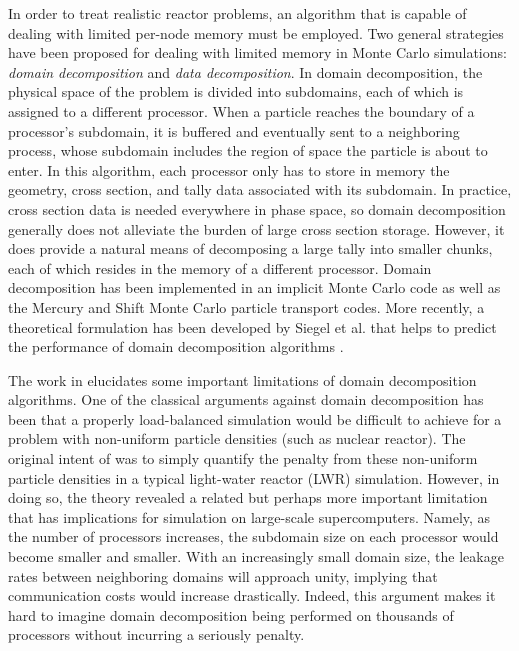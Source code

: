 \documentclass[3p]{elsarticle}
\begin{document}
In order to treat realistic reactor problems, an algorithm that is capable of
dealing with limited per-node memory must be employed. Two general strategies
have been proposed for dealing with limited memory in Monte Carlo simulations:
\emph{domain decomposition} and \emph{data decomposition}. In domain
decomposition, the physical space of the problem is divided into subdomains,
each of which is assigned to a different processor. When a particle reaches the
boundary of a processor's subdomain, it is buffered and eventually sent to a
neighboring process, whose subdomain includes the region of space the particle
is about to enter. In this algorithm, each processor only has to store in memory
the geometry, cross section, and tally data associated with its subdomain. In
practice, cross section data is needed everywhere in phase space, so domain
decomposition generally does not alleviate the burden of large cross section
storage. However, it does provide a natural means of decomposing a large tally
into smaller chunks, each of which resides in the memory of a different
processor. Domain decomposition has been implemented in an implicit Monte Carlo
code \cite{jcp-brunner-2009} as well as the Mercury \cite{mc09-greenman} and
Shift \cite{physor2012-mervin} Monte Carlo particle transport codes. More
recently, a theoretical formulation has been developed by Siegel et al. that
helps to predict the performance of domain decomposition algorithms
\cite{jcp-siegel-2012-1, jcp-siegel-2012-2}.

The work in \cite{jcp-siegel-2012-2} elucidates some important limitations of
domain decomposition algorithms. One of the classical arguments against domain
decomposition has been that a properly load-balanced simulation would be
difficult to achieve for a problem with non-uniform particle densities (such as
nuclear reactor). The original intent of \cite{jcp-siegel-2012-2} was to simply
quantify the penalty from these non-uniform particle densities in a typical
light-water reactor (LWR) simulation. However, in doing so, the theory revealed
a related but perhaps more important limitation that has implications for
simulation on large-scale supercomputers. Namely, as the number of processors
increases, the subdomain size on each processor would become smaller and
smaller. With an increasingly small domain size, the leakage rates between
neighboring domains will approach unity, implying that communication costs would
increase drastically. Indeed, this argument makes it hard to imagine domain
decomposition being performed on thousands of processors without incurring a
seriously penalty.
\end{document}

